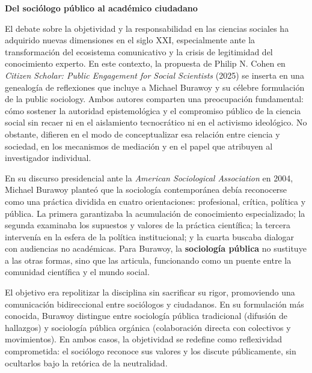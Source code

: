 \documentclass[
  spanish,
  letterpaper,
  DIV=11,
  numbers=noendperiod]{scrreprt}
\begin{document}
\begin{tcolorbox}[enhanced jigsaw, bottomtitle=1mm, toprule=.15mm, colbacktitle=quarto-callout-note-color!10!white, bottomrule=.15mm, leftrule=.75mm, colframe=quarto-callout-note-color-frame, opacitybacktitle=0.6, titlerule=0mm, breakable, colback=white, left=2mm, arc=.35mm, title=\textcolor{quarto-callout-note-color}{\faInfo}\hspace{0.5em}{Nota}, toptitle=1mm, coltitle=black, rightrule=.15mm, opacityback=0]

\textbf{Del sociólogo público al académico ciudadano}

El debate sobre la objetividad y la responsabilidad en las ciencias
sociales ha adquirido nuevas dimensiones en el siglo XXI, especialmente
ante la transformación del ecosistema comunicativo y la crisis de
legitimidad del conocimiento experto. En este contexto, la propuesta de
Philip N. Cohen en \emph{Citizen Scholar: Public Engagement for Social
Scientists} (2025) se inserta en una genealogía de reflexiones que
incluye a Michael Burawoy y su célebre formulación de la public
sociology. Ambos autores comparten una preocupación fundamental: cómo
sostener la autoridad epistemológica y el compromiso público de la
ciencia social sin recaer ni en el aislamiento tecnocrático ni en el
activismo ideológico. No obstante, difieren en el modo de conceptualizar
esa relación entre ciencia y sociedad, en los mecanismos de mediación y
en el papel que atribuyen al investigador individual.

En su discurso presidencial ante la \emph{American Sociological
Association} en 2004, Michael Burawoy planteó que la sociología
contemporánea debía reconocerse como una práctica dividida en cuatro
orientaciones: profesional, crítica, política y pública. La primera
garantizaba la acumulación de conocimiento especializado; la segunda
examinaba los supuestos y valores de la práctica científica; la tercera
intervenía en la esfera de la política institucional; y la cuarta
buscaba dialogar con audiencias no académicas. Para Burawoy, la
\textbf{sociología pública} no sustituye a las otras formas, sino que
las articula, funcionando como un puente entre la comunidad científica y
el mundo social.

El objetivo era repolitizar la disciplina sin sacrificar su rigor,
promoviendo una comunicación bidireccional entre sociólogos y
ciudadanos. En su formulación más conocida, Burawoy distingue entre
sociología pública tradicional (difusión de hallazgos) y sociología
pública orgánica (colaboración directa con colectivos y movimientos). En
ambos casos, la objetividad se redefine como reflexividad comprometida:
el sociólogo reconoce sus valores y los discute públicamente, sin
ocultarlos bajo la retórica de la neutralidad.


\end{tcolorbox}
\end{document}
